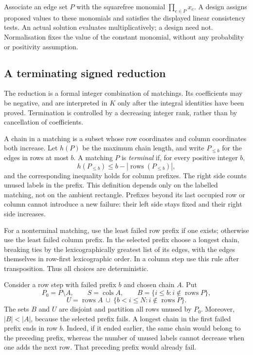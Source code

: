 Associate an edge set $P$ with the squarefree monomial
$\prod_{e\in P}x_e$. A design assigns proposed values to these
monomials and satisfies the displayed linear consistency tests.
An actual solution evaluates multiplicatively; a design need not.
Normalisation fixes the value of the constant monomial, without any
probability or positivity assumption.

\subsection{A terminating signed reduction}
The reduction is a formal integer combination of matchings.
Its coefficients may be negative, and are interpreted in $K$ only
after the integral identities have been proved. Termination is
controlled by a decreasing integer rank, rather than by cancellation
of coefficients.

A chain in a matching is a subset whose row coordinates and column
coordinates both increase.  Let $h(P)$ be the maximum chain length, and
write $P_{\leq b}$ for the edges in rows at most $b$.  A matching $P$ is
\emph{terminal} if, for every positive integer $b$,
\[
 h(P_{\leq b})\leq b-|\operatorname{rows}(P_{\leq b})|,
\]
and the corresponding inequality holds for column prefixes.  The right
side counts unused labels in the prefix.  This definition depends only
on the labelled matching, not on the ambient rectangle.  Prefixes beyond
its last occupied row or column cannot introduce a new failure: their
left side stays fixed and their right side increases.

For a nonterminal matching, use the least failed row prefix if one exists;
otherwise use the least failed column prefix.  In the selected prefix
choose a longest chain, breaking ties by the lexicographically greatest
list of its edges, with the edges themselves in row-first lexicographic
order.  In a column step use this rule after transposition.  Thus all
choices are deterministic.

Consider a row step with failed prefix $b$ and chosen chain $A$.  Put
\[
 P_0=P\setminus A,\qquad S=\operatorname{cols}A,\qquad
 B=\{i\leq b:i\notin\operatorname{rows}P\},
\]
\[
 U=\operatorname{rows}A\ \cup\
       \{b<i\leq N:i\notin\operatorname{rows}P\}.
\]
The sets $B$ and $U$ are disjoint and partition all rows unused by $P_0$.
Moreover, $|B|<|A|$, because the selected prefix fails.  A longest chain
in the first failed prefix ends in row $b$.  Indeed, if it ended earlier,
the same chain would belong to the preceding prefix, whereas the number
of unused labels cannot decrease when one adds the next row.  That
preceding prefix would already fail.

